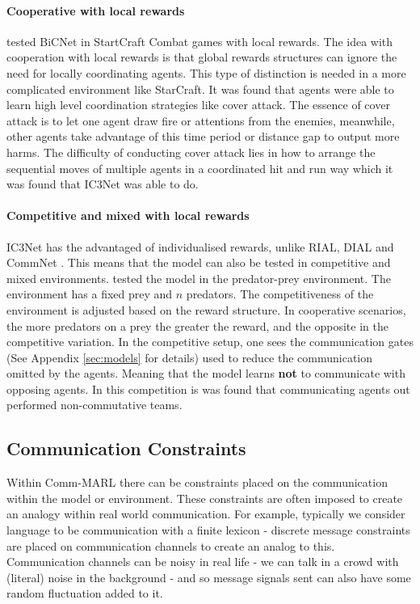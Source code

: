 \documentclass{article}
\begin{document}
\paragraph{Cooperative with local rewards}

\citet{peng2017bicnet} tested BiCNet in StartCraft Combat games with local rewards. The idea with cooperation with local rewards is that global rewards structures can ignore the need for locally coordinating agents. This type of distinction is needed in a more complicated environment like StarCraft. It was found that agents were able to learn high level coordination strategies  like cover attack. The essence of cover attack is to let one agent draw fire or attentions from the enemies, meanwhile, other agents take  advantage of this time period or distance gap to output more  harms. The difficulty of conducting cover attack lies in how  to arrange the sequential moves of multiple agents in a coordinated hit and run way which it was found that IC3Net was able to do.

\paragraph{Competitive and mixed with local rewards}

IC3Net \citep{singh2018ic3net} has the advantaged of individualised rewards, unlike RIAL, DIAL \citep{foerster2016learning} and CommNet \citep{sukhbaatar2016commnet}. This means that the model can also be tested in competitive and mixed environments. \citet{singh2018ic3net} tested the model in the predator-prey environment. The environment has a fixed prey and $n$ predators. The competitiveness of the environment is adjusted based on the reward structure. In cooperative scenarios, the more predators on a prey the greater the reward, and the opposite in the competitive variation. In the competitive setup, one sees the communication gates (See Appendix \ref{sec:models} for details) used to reduce the communication omitted by the agents. Meaning that the model learns \textbf{not} to communicate with opposing agents. In this competition is was found that communicating agents out performed non-commutative teams.

\subsection{Communication Constraints}

Within Comm-MARL there can be constraints placed on the communication within the model or environment. These constraints are often imposed to create an analogy within real world communication. For example, typically we consider language to be communication with a finite lexicon - discrete message constraints are placed on communication channels to create an analog to this. Communication channels can be noisy in real life - we can talk in a crowd with (literal) noise in the background - and so message signals sent can also have some random fluctuation added to it.
\end{document}
